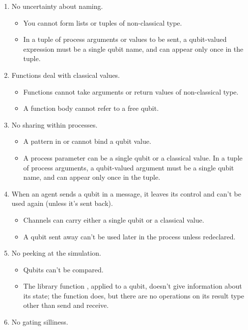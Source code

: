 \begin{enumerate}
\item No uncertainty about naming.
\begin{itemize}
\item You cannot form lists or tuples of non-classical type. 
\item In a tuple of process arguments or values to be sent, a qubit-valued expression must be a single qubit name, and can appear only once in the tuple.
\end{itemize}
\item Functions deal with classical values.
\begin{itemize}
\item Functions cannot take arguments or return values of non-classical type.
\item A function body cannot refer to a free qubit.
\end{itemize}
\item No sharing within processes.
\begin{itemize}
\item A pattern in  or  cannot bind a qubit value.
\item A process parameter can be a single qubit or a classical value. In a tuple of process arguments, a qubit-valued argument must be a single qubit name, and can appear only once in the tuple.
\end{itemize}
\item When an agent sends a qubit in a message, it leaves its control and can't be used again (unless it's sent back). 
\begin{itemize}
\item Channels can carry either a single qubit or a classical value.
\item A qubit sent away can't be used later in the process unless redeclared.
\end{itemize}
\item No peeking at the simulation.
\begin{itemize}
\item Qubits can't be compared.
\item The library function , applied to a qubit, doesn't give information about its state; the function  does, but there are no operations on its result type  other than send and receive.
\end{itemize}
\item No gating silliness.
\begin{itemize}

\end{itemize}
\end{enumerate}
